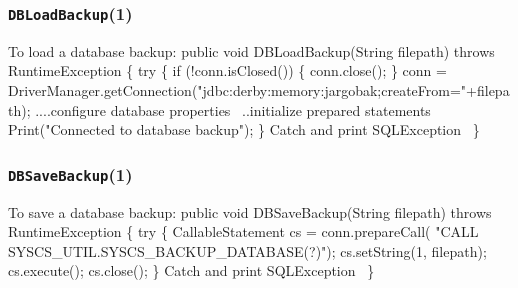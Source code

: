 \documentclass{article}
\def\nwendcode{\endtrivlist \endgroup}
\let\nwdocspar=\par
\theoremstyle{definition}
\begin{document}
\subsubsection{{\tt{}DBLoadBackup}(1)}
\label{sec:load-database-backup}
To load a database backup:
\nwenddocs{}\endmoddef{}
public void DBLoadBackup(String filepath) throws RuntimeException \{
  try \{
    if (!conn.isClosed()) \{
      conn.close();
    \}
    conn = DriverManager.getConnection("jdbc:derby:memory:jargobak;createFrom="+filepath);
    \LA{}....configure database properties~{\nwtagstyle{}}\RA{}
    \LA{}..initialize prepared statements~{\nwtagstyle{}}\RA{}
    Print("Connected to database backup");
  \}
  \LA{}Catch and print \code{}SQLException\edoc{}~{\nwtagstyle{}}\RA{}
\}
\nwendcode{}\nwdocspar
\subsubsection{{\tt{}DBSaveBackup}(1)}
\label{sec:save-database-backup}
To save a database backup:
\nwenddocs{}\endmoddef{}
public void DBSaveBackup(String filepath) throws RuntimeException \{
  try \{
    CallableStatement cs = conn.prepareCall(
      "CALL SYSCS_UTIL.SYSCS_BACKUP_DATABASE(?)");
    cs.setString(1, filepath);
    cs.execute();
    cs.close();
  \}
  \LA{}Catch and print \code{}SQLException\edoc{}~{\nwtagstyle{}}\RA{}
\}
\nwendcode{}\nwdocspar
\end{document}
